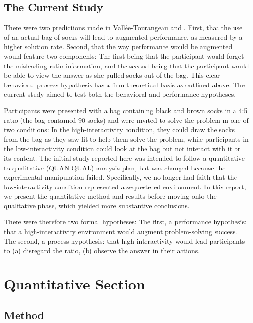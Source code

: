 \documentclass{article}
\begin{document}
\subsection{The Current Study}

There were two predictions made in Vallée-Tourangeau and \parencite{March2020}. First, that the use of an actual bag of socks will lead to augmented performance, as measured by a higher solution rate. Second, that the way performance would be augmented would feature two components: The first being that the participant would forget the misleading ratio information, and the second being that the participant would be able to view the answer as she pulled socks out of the bag. This clear behavioral process hypothesis has a firm theoretical basis as outlined above. The current study aimed to test both the behavioral and performance hypotheses. 

Participants were presented with a bag containing black and brown socks in a 4:5 ratio (the bag contained 90 socks) and were invited to solve the problem in one of two conditions: In the high-interactivity condition, they could draw the socks from the bag as they saw fit to help them solve the problem, while participants in the low-interactivity condition could look at the bag but not interact with it or its content. The initial study reported here was intended to follow a quantitative to qualitative (QUAN QUAL) analysis plan, but was changed because the experimental manipulation failed. Specifically, we no longer had faith that the low-interactivity condition represented a sequestered environment. In this report, we present the quantitative method and results before moving onto the qualitative phase, which yielded more substantive conclusions. 

There were therefore two formal hypotheses: The first, a performance hypothesis: that a high-interactivity environment would augment problem-solving success. The second, a process hypothesis: that high interactivity would lead participants to (a) disregard the ratio, (b) observe the answer in their actions.

\section{Quantitative Section}

\subsection{Method}
\end{document}
